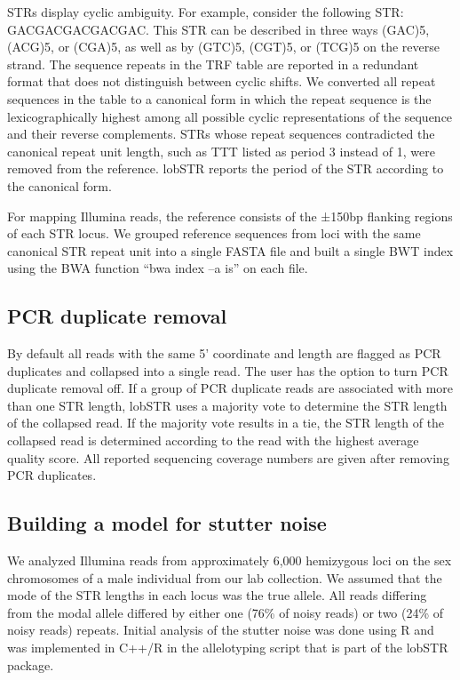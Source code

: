 {STRs display cyclic ambiguity. For example, consider the following STR: GACGACGACGACGAC. This STR can be described in three ways (GAC)5, (ACG)5, or (CGA)5, as well as by (GTC)5, (CGT)5, or (TCG)5 on the reverse strand. The sequence repeats in the TRF table are reported in a redundant format that does not distinguish between cyclic shifts. We converted all repeat sequences in the table to a canonical form in which the repeat sequence is the lexicographically highest among all possible cyclic representations of the sequence and their reverse complements. STRs whose repeat sequences contradicted the canonical repeat unit length, such as TTT listed as period 3 instead of 1, were removed from the reference. lobSTR reports the period of the STR according to the canonical form.

For mapping Illumina reads, the reference consists of the ±150bp flanking regions of each STR locus. We grouped reference sequences from loci with the same canonical STR repeat unit into a single FASTA file and built a single BWT index using the BWA function ``bwa index –a is'' on each file.

\subsection{PCR duplicate removal}
By default all reads with the same 5' coordinate and length are flagged as PCR duplicates and collapsed into a single read. The user has the option to turn PCR duplicate removal off. If a group of PCR duplicate reads are associated with more than one STR length, lobSTR uses a majority vote to determine the STR length of the collapsed read. If the majority vote results in a tie, the STR length of the collapsed read is determined according to the read with the highest average quality score. All reported sequencing coverage numbers are given after removing PCR duplicates.

\subsection{Building a model for stutter noise}
We analyzed Illumina reads from approximately 6,000 hemizygous loci on the sex chromosomes of a male individual from our lab collection. We assumed that the mode of the STR lengths in each locus was the true allele. All reads differing from the modal allele differed by either one (76\% of noisy reads) or two (24\% of noisy reads) repeats. Initial analysis of the stutter noise was done using R and was implemented in C++/R in the allelotyping script that is part of the lobSTR package.

}
